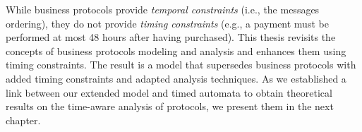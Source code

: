 While business protocols provide \emph{temporal constraints} (i.e., the messages ordering), they do not provide \emph{timing constraints} (e.g., a payment must be performed at most 48 hours after having purchased). This thesis revisits the concepts of business protocols modeling and analysis and enhances them using timing constraints. The result is a model that supersedes business protocols with added timing constraints and adapted analysis techniques. As we  established a link between our extended model and timed automata \cite{RADLD94} to obtain theoretical results on the time-aware analysis of protocols, we present them in the next chapter.

